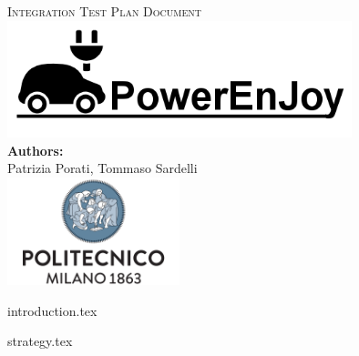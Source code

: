 \documentclass[a4paper,11pt]{article}
\begin{document}
\begin{titlepage}
\begin{center}
\textsc{\LARGE Integration Test Plan Document}\\[1.5cm] %

\includegraphics[width=10cm]{PowerEnJoy.png}\\
 
\vfill
\vfill
\textbf{Authors:}\\
Patrizia Porati, Tommaso Sardelli\\[2.0cm] 


\vfill
\vfill
\includegraphics[width=50mm]{polimi.png}\\
\end{center}
\end{titlepage}

\tableofcontents
\pagebreak


{introduction.tex}

{strategy.tex}







\end{document}
